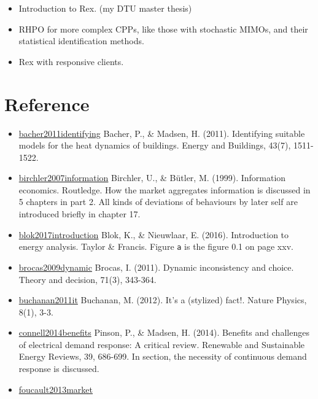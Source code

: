 \documentclass[letterpaper,8pt,twocolumn,twoside,]{pinp}
\providecommand{\tightlist}{%
  \setlength{\itemsep}{0pt}\setlength{\parskip}{0pt}}
\begin{document}
\begin{itemize}
\tightlist
\item
  Introduction to Rex. (my DTU master thesis)
\item
  RHPO for more complex CPPs, like those with stochastic MIMOs, and
  their statistical identification methods.
\item
  Rex with responsive clients.
\end{itemize}

\hypertarget{reference}{%
\section{Reference}\label{reference}}

\begin{itemize}
\tightlist
\item
  \href{https://www.sciencedirect.com/science/article/pii/S0378778811000491}{bacher2011identifying}
  Bacher, P., \& Madsen, H. (2011). Identifying suitable models for the
  heat dynamics of buildings. Energy and Buildings, 43(7), 1511-1522.
\item
  \href{https://www.taylorfrancis.com/books/9780203946558}{birchler2007information}
  Birchler, U., \& Bütler, M. (1999). Information economics. Routledge.
  How the market aggregates information is discussed in 5 chapters in
  part 2. All kinds of deviations of behaviours by later self are
  introduced briefly in chapter 17.
\item
  \href{https://www.taylorfrancis.com/books/9781315617213}{blok2017introduction}
  Blok, K., \& Nieuwlaar, E. (2016). Introduction to energy analysis.
  Taylor \& Francis. Figure \texttt{a} is the figure 0.1 on page xxv.
\item
  \href{https://link.springer.com/article/10.1007/s11238-009-9183-x}{brocas2009dynamic}
  Brocas, I. (2011). Dynamic inconsistency and choice. Theory and
  decision, 71(3), 343-364.
\item
  \href{https://www.nature.com/articles/nphys2191}{buchanan2011it}
  Buchanan, M. (2012). It's a (stylized) fact!. Nature Physics, 8(1),
  3-3.
\item
  \href{https://www.sciencedirect.com/science/article/pii/S1364032114005504}{connell2014benefits}
  Pinson, P., \& Madsen, H. (2014). Benefits and challenges of
  electrical demand response: A critical review. Renewable and
  Sustainable Energy Reviews, 39, 686-699. In section, the necessity of
  continuous demand response is discussed.
\item
  \href{https://www.oxfordscholarship.com/view/10.1093/acprof:oso/9780199936243.001.0001/acprof-9780199936243}{foucault2013market}

\end{itemize}
\end{document}
